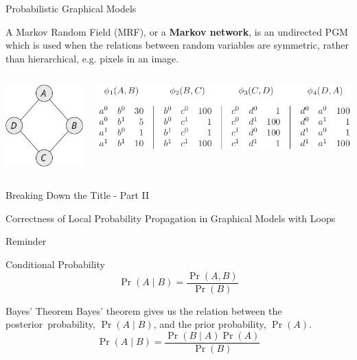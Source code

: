 \documentclass{beamer}
\begin{document}
\begin{frame}{Probabilistic Graphical Models}
    \pause
    \begin{definition}
        A Markov Random Field (MRF), or a \textbf{Markov network}, is an undirected PGM which is used when the relations between
        random variables are symmetric, rather than hierarchical, e.g. pixels in an image.
    \end{definition}
    \pause
    \begin{columns}
        \begin{column}[t]{0.2 \textwidth}
            \includegraphics[scale=0.4]{mrf1}
        \end{column}
        \begin{column}[t]{0.8 \textwidth}
            \includegraphics[scale=0.4]{mrf2}
        \end{column}
    \end{columns}
\end{frame}
\begin{frame}{Breaking Down the Title - Part II}
    \begin{center}
        \Large{Correctness of \alert<2>{Local Probability Propagation} in \alert<1>{Graphical Models} with Loops}
    \end{center}
\end{frame}
\begin{frame}{Reminder}
    \begin{block}{Conditional Probability}
        \[ \Pr \left( A \mid B \right) = \frac{\Pr \left( A, B \right)}{\Pr \left( B \right)} \]
    \end{block}
    \pause
    \begin{block}{Bayes' Theorem}
        Bayes' theorem gives us the relation between the \alert{posterior~probability}, $ \Pr \left( A \mid B \right) $, and the \alert{prior probability}, $ \Pr \left( A \right) $.
        \[ \Pr \left( A \mid B \right) = \frac{\Pr \left( B \mid A \right) \Pr \left( A \right)}{\Pr \left( B \right)} \]
    \end{block}
\end{frame}
\end{document}
